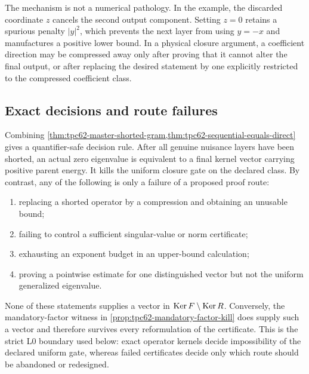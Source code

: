 The mechanism is not a numerical pathology.  In the example, the
discarded coordinate \(z\) cancels the second output component.  Setting
\(z=0\) retains a spurious penalty \(|y|^2\), which prevents the next
layer from using \(y=-x\) and manufactures a positive lower bound.  In a
physical closure argument, a coefficient direction may be compressed
away only after proving that it cannot alter the final output, or after
replacing the desired statement by one explicitly restricted to the
compressed coefficient class.

\subsection{Exact decisions and route failures}

Combining
\cref{thm:tpc62-master-shorted-gram,thm:tpc62-sequential-equals-direct}
gives a quantifier-safe decision rule.
After all genuine nuisance layers have been shorted, an actual zero
eigenvalue is equivalent to a final kernel vector carrying positive parent
energy.  It kills the uniform closure gate on the declared class.  By
contrast, any of the following is only a failure of a proposed proof
route:
\begin{enumerate}[label=\textup{(\roman*)},leftmargin=2.7em]
 \item replacing a shorted operator by a compression and obtaining an
       unusable bound;
 \item failing to control a sufficient singular-value or norm
       certificate;
 \item exhausting an exponent budget in an upper-bound calculation;
 \item proving a pointwise estimate for one distinguished vector but not
       the uniform generalized eigenvalue.
\end{enumerate}
None of these statements supplies a vector in
\(\operatorname{Ker} F\setminus\operatorname{Ker} R\).  Conversely, the mandatory-factor witness in
\cref{prop:tpc62-mandatory-factor-kill} does supply such a vector and
therefore survives every reformulation of the certificate.  This is the
strict L0 boundary used below: exact operator kernels decide impossibility
of the declared uniform gate, whereas failed certificates decide only
which route should be abandoned or redesigned.
